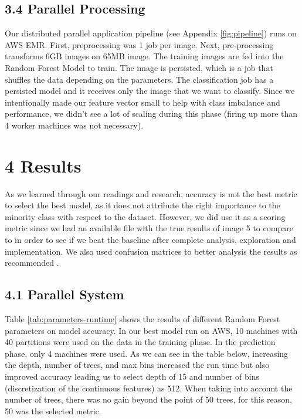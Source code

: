 \documentclass{neu_handout}
\begin{document}
\subsection*{3.4 Parallel Processing}
Our distributed parallel application pipeline (see Appendix \ref{fig:pipeline}) runs on AWS EMR. First, preprocessing was 1 job per image. Next, pre-processing transforms 6GB images on 65MB image. The training images are fed into the Random Forest Model to train. The image is persisted, which is a job that shuffles the data depending on the parameters. The classification job has a persisted model and it receives only the image that we want to classify. Since we intentionally made our feature vector small to help with class imbalance and performance, we didn’t see a lot of scaling during this phase (firing up more than 4 worker machines was not necessary).

\section*{4 Results}

As we learned through our readings and research, accuracy is not the best metric to select the best model, as it does not attribute the right importance to the minority class with respect to the dataset. However, we did use it as a scoring metric since we had an available file with the true results of image 5 to compare to in order to see if we beat the baseline after complete analysis, exploration and implementation. We also used confusion matrices to better analysis the results as recommended \cite{imbalance}.

\subsection*{4.1 Parallel System}
Table \ref{tab:parameters-runtime} shows the results of different Random Forest parameters on model accuracy. In our best model run on AWS, 10 machines with 40 partitions were used on the data in the training phase. In the prediction phase, only 4 machines were used. As we can see in the table below, increasing the depth, number of trees, and max bins increased the run time but also improved accuracy leading us to select depth of 15 and number of bins (discretization of the continuous features) as 512. When taking into account the number of trees, there was no gain beyond the point of 50 trees, for this reason, 50 was the selected metric.\\
\end{document}
